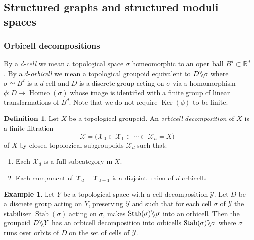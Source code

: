 \documentclass[english,11pt,leqno]{article}
\def\RR{\mathbb{R}}
\def\Xc{\mathcal{X}}
\def\Yc{\mathcal{Y}}
\def\Ker{\operatorname{Ker}\nolimits}
\def\on{\operatorname}
\def\bbs{{\backslash\hskip -1mm \backslash}}
\def\bbs{\backslash \hskip -.1cm \backslash}
\def\Yc{{\mathcal Y}}
\def\Homeo{{ \on{Homeo}}}
\def\Tess{\on{Tess}}
\def\Bar{{\on{Bar}}}
\def\bar{{\on{bar}}}
\theoremstyle{definition}
\newtheorem{defi}[thm]{Definition}
\newtheorem{exa}[thm]{Example}
\theoremstyle{remark}
\numberwithin{equation}{section}
\begin{document}
 

 
\def\Tess{\on{Tess}}
\def\Bar{{\on{Bar}}}
\def\bar{{\on{bar}}}
 
\subsection{Structured graphs and structured moduli spaces}
  
  \def\Cell{{\on{Cell}}}
  
  \subsubsection{Orbicell decompositions}
  
  By a $d$-{\em cell} we mean a topological space $\sigma$ homeomorphic to
  an open ball  $B^d \subset \RR^d$. By a $d$-{\em orbicell} we mean a topological groupoid equivalent
  to $D\bbs\sigma$ where $\sigma\simeq B^d$ is a $d$-cell and $D$ is a discrete group acting on $\sigma$ via a
  homomorphism $\phi: D\to\Homeo(\sigma)$ whose image is identified with  a finite group  
   of linear transformations of $B^d$. Note that we do not require $\Ker(\phi)$ to be finite.
   
   \begin{defi}
   Let $X$ be a topological groupoid. An {\em orbicell decomposition} of $X$ is a finite filtration
   \[
   \Xc = \bigl( \Xc_0\subset\Xc_1 \subset\cdots\subset \Xc_n = X)
   \]
   of $X$ by closed topological subgroupoids $\Xc_d$ such that:
   \begin{enumerate}
   \item[(1)] Each $\Xc_d$ is a full subcategory in $X$.
   
   \item[(2)] Each component of $\Xc_d-\Xc_{d-1}$ is a disjoint union of $d$-orbicells.
   \end{enumerate}
   
   \end{defi}
  
  \begin{exa}\label{ex:regular-cell}
  Let $Y$ be a topological space with a cell decomposition $\Yc$. Let $D$ be a discrete
  group acting on $Y$, preserving $\Yc$ and such that for each cell $\sigma$ of $\Yc$ the stabilizer $\on{Stab}(\sigma)$
 acting on $\sigma$, makes $\on{Stab}(\sigma)\bbs\sigma$ into an orbicell. Then the groupoid
 $D\bbs Y$ has an orbicell decomposition into orbicells $\on{Stab}(\sigma)\bbs\sigma$ where $\sigma$ runs
 over orbits of $D$ on the set of cells of $\Yc$. 
  \end{exa}
  
\end{document}
